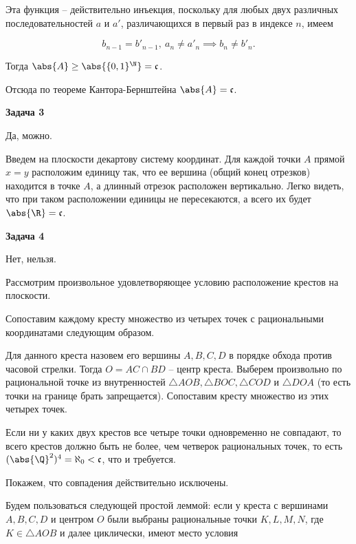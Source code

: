 		Эта функция -- действительно инъекция, поскольку для любых двух различных последовательностей $a$ и $a'$, различающихся в первый раз в индексе $n$, имеем

		\begin{equation*}
			b_{n-1} = b'_{n-1}, \ a_n \ne a'_n \implies b_n \ne b'_n.
		\end{equation*}

		Тогда $\abs{A} \ge \abs{\{0, 1\}^{\N}} = \mathfrak{c}$.

		Отсюда по теореме Кантора-Бернштейна $\abs{A} = \mathfrak{c}$.


	\begin{center}
    \textbf{Задача 3}
\end{center}
		Да, можно.

		Введем на плоскости декартову систему координат. Для каждой точки $A$ прямой $x = y$ расположим единицу так, что ее вершина (общий конец отрезков) находится в точке $A$, а длинный отрезок расположен вертикально. Легко видеть, что при таком расположении единицы не пересекаются, а всего их будет $\abs{\R} = \mathfrak{c}$.


	\begin{center}
    \textbf{Задача 4}
\end{center}
		Нет, нельзя.

		Рассмотрим произвольное удовлетворяющее условию расположение крестов на плоскости.

		Сопоставим каждому кресту множество из четырех точек с рациональными координатами следующим образом.

		Для данного креста назовем его вершины $A, B, C, D$ в порядке обхода против часовой стрелки. Тогда $O = AC \cap BD$ -- центр креста. Выберем произвольно по рациональной точке из внутренностей $\triangle AOB, \triangle BOC, \triangle COD$ и $\triangle DOA$ (то есть точки на границе брать запрещается). Сопоставим кресту множество из этих четырех точек.

		Если ни у каких двух крестов все четыре точки одновременно не совпадают, то всего крестов должно быть не более, чем четверок рациональных точек, то есть $(\abs{\Q}^2)^4 = \aleph_0 < \mathfrak{c}$, что и требуется.

		Покажем, что совпадения действительно исключены.

		Будем пользоваться следующей простой леммой: если у креста с вершинами $A, B, C, D$ и центром $O$ были выбраны рациональные точки $K, L, M, N$, где $K \in \triangle AOB$ и далее циклически, имеют место условия


